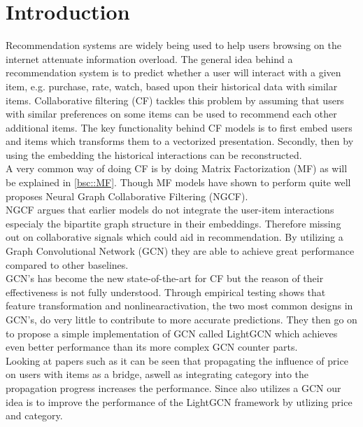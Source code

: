 \section{Introduction}
Recommendation systems are widely being used to help users browsing on the internet attenuate information overload\cite{YT_rec,Pint_rec}.
The general idea behind a recommendation system is to predict whether a user will interact with a given item, e.g. purchase, rate, watch, based upon their historical data with similar items.
Collaborative filtering (CF) tackles this problem by assuming that users with similar preferences on some items can be used to recommend each other additional items.
The key functionality behind CF models is to first embed users and items which transforms them to a vectorized presentation.
Secondly, then by using the embedding the historical interactions can be reconstructed.
\\
A very common way of doing CF is by doing Matrix Factorization (MF) as will be explained in \autoref{bsc::MF}.
Though MF models have shown to perform quite well \cite{NGCF_2019} proposes Neural Graph Collaborative Filtering (NGCF).
\\ 
NGCF argues that earlier models do not integrate the user-item interactions especialy the bipartite graph structure in their embeddings.
Therefore missing out on collaborative signals which could aid in recommendation.
By utilizing a Graph Convolutional Network (GCN) they are able to achieve great performance compared to other baselines.
\\
GCN's has become the new state-of-the-art for CF but the reason of their effectiveness is not fully understood\cite{lightgcn}.
Through empirical testing \cite{lightgcn} shows that feature transformation and nonlinearactivation, the two most common designs in GCN's, do very little to contribute to more accurate predictions.
They then go on to propose a simple implementation of GCN called LightGCN which achieves even better performance than its more complex GCN counter parts.
\\
Looking at papers such as \cite{Priceaware} it can be seen that propagating the influence of price on users with items as a bridge, aswell as integrating category into the propagation progress increases the performance.
Since \cite{Priceaware} also utilizes a GCN our idea is to improve the performance of the LightGCN framework by utlizing price and category.
